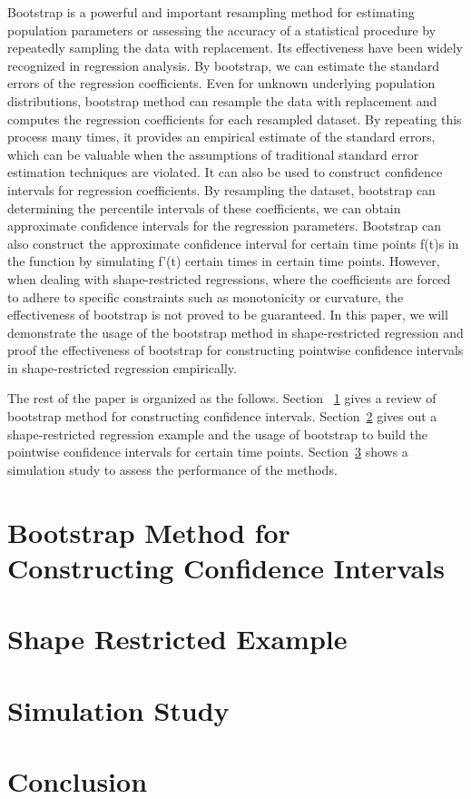 \documentclass[12pt]{article}
\begin{document}
Bootstrap is a powerful and important resampling method for estimating 
population parameters or assessing the accuracy of a statistical procedure
by repeatedly sampling the data with replacement. Its effectiveness have 
been widely recognized in regression analysis. By bootstrap, we can 
estimate the standard errors of the regression coefficients. Even for
unknown underlying population distributions, bootstrap method can resample
the data with replacement and computes the regression coefficients for 
each resampled dataset. By repeating this process many times, it provides
an empirical estimate of the standard errors, which can be valuable when
the assumptions of traditional standard error estimation techniques are 
violated. It can also be used to construct confidence intervals for 
regression coefficients. By resampling the dataset, bootstrap can 
determining the percentile intervals of these coefficients, we can obtain
approximate confidence intervals for the regression parameters. Bootstrap
can also construct the approximate confidence interval for certain time
points f(t)s in the function by simulating f'(t) certain times in certain
time points. However, when dealing with shape-restricted regressions, where
the coefficients are forced to adhere to specific constraints such as monotonicity
or curvature, the effectiveness of bootstrap is not proved to be guaranteed.
In this paper, we will demonstrate the usage of the bootstrap method in 
shape-restricted regression and proof the effectiveness of bootstrap for 
constructing pointwise confidence intervals in shape-restricted regression empirically.

The rest of the paper is organized as the follows. Section 
~\ref{Bootstrap Method for Constructing Confidence Intervals} gives a review of 
bootstrap method for constructing confidence intervals. 
Section~\ref{Shape Restricted Example} gives out a shape-restricted regression example
and the usage of bootstrap to build the pointwise confidence intervals for certain time
points. Section~\ref{Simulation Study} shows a simulation study to assess the 
performance of the methods.


\section{Bootstrap Method for Constructing Confidence Intervals}
\label{Bootstrap Method for Constructing Confidence Intervals}


\section{Shape Restricted Example}
\label{Shape Restricted Example}


\section{Simulation Study}
\label{Simulation Study}


\section{Conclusion}
\label{Conclusion}




\end{document}
